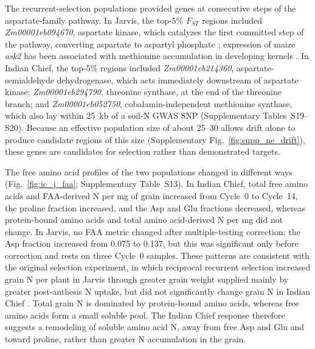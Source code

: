 The recurrent-selection populations provided genes at consecutive steps of the aspartate-family pathway. In Jarvis, the top-5\% $F_{ST}$ regions included \textit{Zm00001eb094670}, aspartate kinase, which catalyzes the first committed step of the pathway, converting aspartate to aspartyl phosphate \citep{Viola2001AspartatePathway,Wang2018AspSeeds}; expression of maize \textit{ask2} has been associated with methionine accumulation in developing kernels \citep{Duo2026Ask2}. In Indian Chief, the top-5\% regions included \textit{Zm00001eb214360}, aspartate-semialdehyde dehydrogenase, which acts immediately downstream of aspartate kinase; \textit{Zm00001eb294790}, threonine synthase, at the end of the threonine branch; and \textit{Zm00001eb052750}, cobalamin-independent methionine synthase, which also lay within 25~kb of a soil-N GWAS SNP (Supplementary Tables~S19--S20). Because an effective population size of about 25--30 allows drift alone to produce candidate regions of this size (Supplementary Fig.~\ref{fig:supp_ne_drift}), these genes are candidates for selection rather than demonstrated targets.

The free amino acid profiles of the two populations changed in different ways (Fig.~\ref{fig:ic_j_faa}; Supplementary Table~S13). In Indian Chief, total free amino acids and FAA-derived N per mg of grain increased from Cycle~0 to Cycle~14, the proline fraction increased, and the Asp and Glu fractions decreased, whereas protein-bound amino acids and total amino acid-derived N per mg did not change. In Jarvis, no FAA metric changed after multiple-testing correction; the Asp fraction increased from 0.075 to 0.137, but this was significant only before correction and rests on three Cycle~0 samples. These patterns are consistent with the original selection experiment, in which reciprocal recurrent selection increased grain N per plant in Jarvis through greater grain weight supplied mainly by greater post-anthesis N uptake, but did not significantly change grain N in Indian Chief \citep{Moll1994}. Total grain N is dominated by protein-bound amino acids, whereas free amino acids form a small soluble pool. The Indian Chief response therefore suggests a remodeling of soluble amino acid N, away from free Asp and Glu and toward proline, rather than greater N accumulation in the grain.

